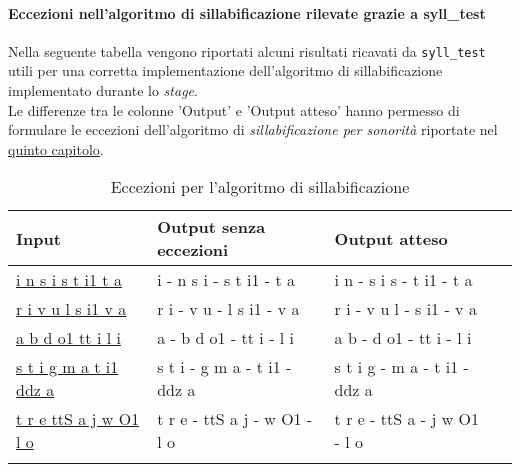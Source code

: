    \paragraph{Eccezioni nell'algoritmo di sillabificazione rilevate grazie a syll\_test}
       Nella seguente tabella vengono riportati alcuni risultati ricavati da \texttt{syll\_test}
       utili per una corretta implementazione dell'algoritmo di sillabificazione implementato 
       durante lo \textit{stage}. \\
       Le differenze tra le colonne 'Output' e 'Output atteso' hanno permesso di formulare
       le eccezioni dell'algoritmo di \textit{sillabificazione per sonorità} riportate nel
       {\hyperref[sec:progettazione]{quinto capitolo}}.
      \begin{center}
        \bgroup
        \def\arraystretch{1.8}
        \begin{longtable}{ | l | p{2cm} | p{4.7cm} | p{2.5cm} |}
        \hline
        \textbf{Input} & \textbf{Output senza eccezioni}
        & \textbf{Output atteso} \\ \hline
        {\hyperref[exc:nasas]{i n s i s t i1 t a}} & i - n s i -  s t i1 - t a & i n - s i s - t i1 - t a \newline  \\ \hline
        {\hyperref[exc:lates]{r i v u l s i1 v a}} & r i - v u - l s i1 - v a & r i - v u l - s i1 - v a \newline  \\ \hline
        {\hyperref[exc:occloccl]{a b d o1 tt i l i}} & a - b d o1 - tt i - l i & a b - d o1 - tt i - l i \newline  \\ \hline
        {\hyperref[exc:occlnasa]{s t i g m a t i1 ddz a}} & s t i - g m a - t i1 - ddz a & s t i g - m a - t i1 - ddz a \newline  \\ \hline
        {\hyperref[exc:apprappr]{t r e ttS a j w O1 l o}} & t r e - ttS a j - w O1 - l o & t r e - ttS a - j w O1 - l o \newline  \\ \hline
        \caption{Eccezioni per l'algoritmo di sillabificazione}
        \end{longtable}
        \egroup
     \end{center}

